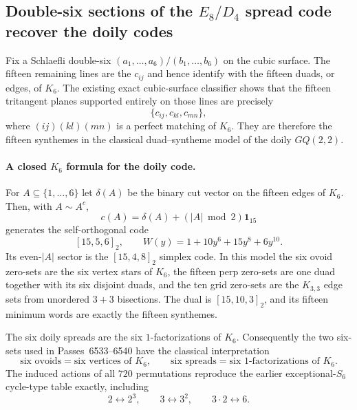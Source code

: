 \subsection{Double-six sections of the $E_8/D_4$ spread code recover the doily codes}
\label{sec:pass7217-7232-double-six-doily}

Fix a Schlaefli double-six $(a_1,\ldots,a_6)/(b_1,\ldots,b_6)$ on the cubic surface.  The fifteen remaining lines are the $c_{ij}$ and hence identify with the fifteen duads, or edges, of $K_6$.  The existing exact cubic-surface classifier shows that the fifteen tritangent planes supported entirely on those lines are precisely
\[
 \{c_{ij},c_{kl},c_{mn}\},
\]
where $(ij)(kl)(mn)$ is a perfect matching of $K_6$.  They are therefore the fifteen synthemes in the classical duad--syntheme model of the doily $GQ(2,2)$.

\paragraph{A closed $K_6$ formula for the doily code.}
For $A\subseteq\{1,\ldots,6\}$ let $\delta(A)$ be the binary cut vector on the fifteen edges of $K_6$.  Then, with $A\sim A^c$,
\[
 \boxed{c(A)=\delta(A)+(|A|\bmod2)\mathbf 1_{15}}
\]
generates the self-orthogonal code
\[
 \boxed{[15,5,6]_2},
 \qquad W(y)=1+10y^6+15y^8+6y^{10}.
\]
Its even-$|A|$ sector is the $[15,4,8]_2$ simplex code.  In this model the six ovoid zero-sets are the six vertex stars of $K_6$, the fifteen perp zero-sets are one duad together with its six disjoint duads, and the ten grid zero-sets are the $K_{3,3}$ edge sets from unordered $3+3$ bisections.  The dual is $[15,10,3]_2$, and its fifteen minimum words are exactly the fifteen synthemes.

The six doily spreads are the six $1$-factorizations of $K_6$.  Consequently the two six-sets used in Passes~6533--6540 have the classical interpretation
\[
 \boxed{\text{six ovoids}=\text{six vertices of }K_6},\qquad
 \boxed{\text{six spreads}=\text{six $1$-factorizations of }K_6}.
\]
The induced actions of all $720$ permutations reproduce the earlier exceptional-$S_6$ cycle-type table exactly, including
\[
 2\leftrightarrow 2^3,\qquad 3\leftrightarrow3^2,\qquad 3\!\cdot\!2\leftrightarrow6.
\]

